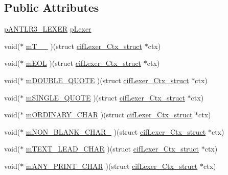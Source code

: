 \subsection*{Public Attributes}
\begin{DoxyCompactItemize}
\item 
\hyperlink{antlr3interfaces_8h_aa9c680e9ec87505c5f2f4af1d8cbb2e2}{p\-A\-N\-T\-L\-R3\-\_\-\-L\-E\-X\-E\-R} \hyperlink{structcif_lexer___ctx__struct_a91ef7436dbc739a84f7824b1ba8b55ee}{p\-Lexer}
\item 
void($\ast$ \hyperlink{structcif_lexer___ctx__struct_a3b93d4ea69d057a181e0e837fa62b381}{m\-T\-\_\-\-\_} )(struct \hyperlink{structcif_lexer___ctx__struct}{cif\-Lexer\-\_\-\-Ctx\-\_\-struct} $\ast$ctx)
\item 
void($\ast$ \hyperlink{structcif_lexer___ctx__struct_affe6c1b545a5966c8faf47dee31ff7e2}{m\-E\-O\-L} )(struct \hyperlink{structcif_lexer___ctx__struct}{cif\-Lexer\-\_\-\-Ctx\-\_\-struct} $\ast$ctx)
\item 
void($\ast$ \hyperlink{structcif_lexer___ctx__struct_aff0fb4d8625a520f42fa5b2eb3f35633}{m\-D\-O\-U\-B\-L\-E\-\_\-\-Q\-U\-O\-T\-E} )(struct \hyperlink{structcif_lexer___ctx__struct}{cif\-Lexer\-\_\-\-Ctx\-\_\-struct} $\ast$ctx)
\item 
void($\ast$ \hyperlink{structcif_lexer___ctx__struct_ad0dc7e6463b8cfd4948a3cdc764e07b9}{m\-S\-I\-N\-G\-L\-E\-\_\-\-Q\-U\-O\-T\-E} )(struct \hyperlink{structcif_lexer___ctx__struct}{cif\-Lexer\-\_\-\-Ctx\-\_\-struct} $\ast$ctx)
\item 
void($\ast$ \hyperlink{structcif_lexer___ctx__struct_ac64dd00b20add2461eab615c758259b7}{m\-O\-R\-D\-I\-N\-A\-R\-Y\-\_\-\-C\-H\-A\-R} )(struct \hyperlink{structcif_lexer___ctx__struct}{cif\-Lexer\-\_\-\-Ctx\-\_\-struct} $\ast$ctx)
\item 
void($\ast$ \hyperlink{structcif_lexer___ctx__struct_a2a64edf9de25e7b6bee8feb757f6f330}{m\-N\-O\-N\-\_\-\-B\-L\-A\-N\-K\-\_\-\-C\-H\-A\-R\-\_\-} )(struct \hyperlink{structcif_lexer___ctx__struct}{cif\-Lexer\-\_\-\-Ctx\-\_\-struct} $\ast$ctx)
\item 
void($\ast$ \hyperlink{structcif_lexer___ctx__struct_a6b3064d0e1e1057869d7aeb037b1f2ae}{m\-T\-E\-X\-T\-\_\-\-L\-E\-A\-D\-\_\-\-C\-H\-A\-R} )(struct \hyperlink{structcif_lexer___ctx__struct}{cif\-Lexer\-\_\-\-Ctx\-\_\-struct} $\ast$ctx)
\item 
void($\ast$ \hyperlink{structcif_lexer___ctx__struct_ac6a416d19049d743e454b7b3d4c33c3b}{m\-A\-N\-Y\-\_\-\-P\-R\-I\-N\-T\-\_\-\-C\-H\-A\-R} )(struct \hyperlink{structcif_lexer___ctx__struct}{cif\-Lexer\-\_\-\-Ctx\-\_\-struct} $\ast$ctx)

\end{DoxyCompactItemize}
